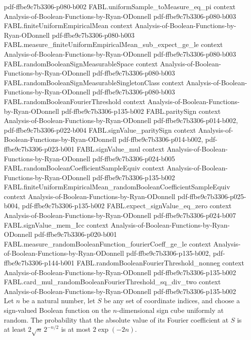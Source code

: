 \begin{theorem}
  {pdf-ffbe9c7b3306-p080-b002}
\proofstep
  {FABL.uniformSample_toMeasure_eq_pi}
  {context}
  {Analysis-of-Boolean-Functions-by-Ryan-ODonnell}
  {pdf-ffbe9c7b3306-p080-b003}
\proofstep
  {FABL.finiteUniformEmpiricalMean}
  {context}
  {Analysis-of-Boolean-Functions-by-Ryan-ODonnell}
  {pdf-ffbe9c7b3306-p080-b003}
\proofstep
  {FABL.measure_finiteUniformEmpiricalMean_sub_expect_ge_le}
  {context}
  {Analysis-of-Boolean-Functions-by-Ryan-ODonnell}
  {pdf-ffbe9c7b3306-p080-b003}
\proofstep
  {FABL.randomBooleanSignMeasurableSpace}
  {context}
  {Analysis-of-Boolean-Functions-by-Ryan-ODonnell}
  {pdf-ffbe9c7b3306-p080-b003}
\proofstep
  {FABL.randomBooleanSignMeasurableSingletonClass}
  {context}
  {Analysis-of-Boolean-Functions-by-Ryan-ODonnell}
  {pdf-ffbe9c7b3306-p080-b003}
\proofstep
  {FABL.randomBooleanFourierThreshold}
  {context}
  {Analysis-of-Boolean-Functions-by-Ryan-ODonnell}
  {pdf-ffbe9c7b3306-p135-b002}
\proofstep
  {FABL.paritySign}
  {context}
  {Analysis-of-Boolean-Functions-by-Ryan-ODonnell}
  {pdf-ffbe9c7b3306-p014-b002,
    pdf-ffbe9c7b3306-p022-b004}
\proofstep
  {FABL.signValue_paritySign}
  {context}
  {Analysis-of-Boolean-Functions-by-Ryan-ODonnell}
  {pdf-ffbe9c7b3306-p014-b002,
    pdf-ffbe9c7b3306-p023-b001}
\proofstep
  {FABL.signValue_mul}
  {context}
  {Analysis-of-Boolean-Functions-by-Ryan-ODonnell}
  {pdf-ffbe9c7b3306-p024-b005}
\proofstep
  {FABL.randomBooleanCoefficientSampleEquiv}
  {context}
  {Analysis-of-Boolean-Functions-by-Ryan-ODonnell}
  {pdf-ffbe9c7b3306-p135-b002}
\proofstep
  {FABL.finiteUniformEmpiricalMean_randomBooleanCoefficientSampleEquiv}
  {context}
  {Analysis-of-Boolean-Functions-by-Ryan-ODonnell}
  {pdf-ffbe9c7b3306-p025-b004,
    pdf-ffbe9c7b3306-p135-b002}
\proofstep
  {FABL.expect_signValue_eq_zero}
  {context}
  {Analysis-of-Boolean-Functions-by-Ryan-ODonnell}
  {pdf-ffbe9c7b3306-p024-b007}
\proofstep
  {FABL.signValue_mem_Icc}
  {context}
  {Analysis-of-Boolean-Functions-by-Ryan-ODonnell}
  {pdf-ffbe9c7b3306-p020-b001}
\proofstep
  {FABL.measure_randomBooleanFunction_fourierCoeff_ge_le}
  {context}
  {Analysis-of-Boolean-Functions-by-Ryan-ODonnell}
  {pdf-ffbe9c7b3306-p135-b002,
    pdf-ffbe9c7b3306-p144-b001}
\proofstep
  {FABL.randomBooleanFourierThreshold_nonneg}
  {context}
  {Analysis-of-Boolean-Functions-by-Ryan-ODonnell}
  {pdf-ffbe9c7b3306-p135-b002}
\proofstep
  {FABL.card_mul_randomBooleanFourierThreshold_sq_div_two}
  {context}
  {Analysis-of-Boolean-Functions-by-Ryan-ODonnell}
  {pdf-ffbe9c7b3306-p135-b002}
Let $n$ be a natural number, let $S$ be any set of coordinate indices, and choose a
sign-valued Boolean function on the $n$-dimensional sign cube uniformly at random. The
probability that the absolute value of its Fourier coefficient at $S$ is at least
$2\sqrt n\,2^{-n/2}$ is at most $2\exp(-2n)$.
\end{theorem}

